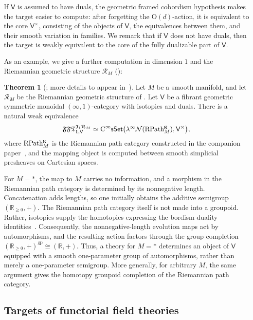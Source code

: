 \documentclass{amsart}
\newcommand{\cat}[1]{\mathsf{#1}}
\newcommand{\sset}{\cat{sSet}}
\newcommand{\nerve}{\mathcal{N}}
\newcommand{\we}{\simeq}
\newcommand{\CsSet}{\textnormal{C}^{\infty}\sset}
\newcommand{\FFT}{\mathfrak{FFT}}
\newcommand{\sheaf}[1]{\mathcal{#1}}
\newcommand{\RM}{\sheaf{R}_{M}}
\newcommand{\RR}{{\mathbb{R}}}
\newcommand{\rpathgermy}{{\mathrm{RPath}}^{\textnormal{\textbf{g}}}_{M}}
\theoremstyle{definition}
\newtheorem*{maintheorem}{Theorem}
\numberwithin{equation}{subsection}
\numberwithin{subsubsection}{subsection}
\begin{document}
If \(\cat{V}\) is assumed to have duals, the geometric framed cobordism
hypothesis makes the target easier to compute: after forgetting the
\(\mathrm{O}(d)\)-action, it is equivalent to the core \(\cat{V}^{\times}\),
consisting of the objects of \(\cat{V}\), the equivalences between them, and
their smooth variation in families. We remark that if \(\cat{V}\) does not have
duals, then the target is weakly equivalent to the core of the fully dualizable
part of \(\cat{V}\).

As an example, we give a further computation in dimension \(1\) and the
Riemannian geometric structure \(\RM\) ():

\begin{maintheorem}[; more
  details to appear in~{\cite[Theorem~5.0.1]{KP26}}]
  Let \(M\) be a smooth manifold, and let \(\RM\) be the Riemannian geometric
  structure of . Let \(\cat{V}\) be a fibrant
  geometric symmetric monoidal \((\infty,1)\)-category with isotopies and duals.
  There is a natural weak equivalence
  \[
    \FFT_{1,\cat{V}}^{\mathfrak{I}_{1}\RM}
    \we
    \CsSet\bigl(
      \lambda^{\infty}\nerve(\rpathgermy),
      \cat{V}^{\times}
    \bigr),
  \]
  where \(\rpathgermy\) is the Riemannian path category constructed in the
  companion paper~\cite{KP26}, and the mapping object is computed between smooth
  simplicial presheaves on Cartesian spaces.
\end{maintheorem}

For \(M=*\), the map to \(M\) carries no information, and a morphism in the
Riemannian path category is determined by its nonnegative length. Concatenation
adds lengths, so one initially obtains the additive semigroup \((\RR_{\geq
0},+)\). The Riemannian path category itself is not made into a groupoid.
Rather, isotopies supply the homotopies expressing the bordism duality
identities~\cite[Examples~5.5.5 and~5.5.7]{GP26}. Consequently, the
nonnegative-length evolution maps act by automorphisms, and the resulting action
factors through the group completion \((\RR_{\geq 0},+)^{\mathrm{gp}} \cong
(\RR,+) \). Thus, a theory for \(M=*\) determines an object of \(\cat{V}\)
equipped with a smooth one-parameter group of automorphisms, rather than merely
a one-parameter semigroup. More generally, for arbitrary \(M\), the same
argument gives the homotopy groupoid completion of the Riemannian path category.

\subsection{Targets of functorial field theories}
\end{document}
